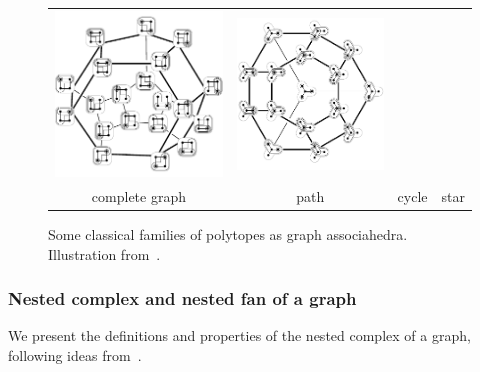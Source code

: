 \documentclass{amsart}
\theoremstyle{definition}
\begin{document}
\begin{figure}[t]
\begin{adjustbox}{center}
\begin{tabular}{c@{\;}c@{\;}c@{\;}c}
			\includegraphics[scale=.6]{cyclohedronTubings} &
			\includegraphics[scale=.6]{stellohedronTubings} \\[.1cm]
			complete graph &
			path &
			cycle &
			star
		\end{tabular}
	\end{adjustbox}
	\caption{Some classical families of polytopes as graph associahedra. Illustration from~\cite{MannevillePilaud-compatibilityFans}.}
	\label{fig:specialGraphAssociahedra}
\end{figure}

\subsubsection{Nested complex and nested fan of a graph}

We present the definitions and properties of the nested complex of a graph, following ideas from~\cite{CarrDevadoss, Postnikov, FeichtnerSturmfels, Zelevinsky}.
\end{document}

